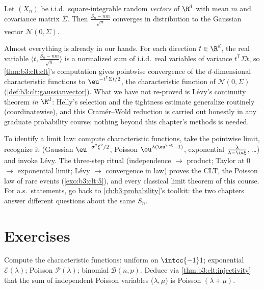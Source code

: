\begin{theorem}
\label{thm:b3:clt:multiclt}
Let $(X_n)$ be i.i.d.\ square-integrable random
\emph{vectors} of $\R^d$ with mean $m$ and covariance matrix
$\Sigma$. Then $\frac{S_n - nm}{\sqrt n}$ converges in
distribution to the Gaussian vector $\mathcal N(0,
\Sigma)$.
\admitted
\end{theorem}

\begin{remark}\label{rem:b3:clt:multiclt}
Almost everything is already in our hands. For each
direction $t \in \R^d$, the real variable $\langle t,
\frac{S_n - nm}{\sqrt n}\rangle$ is a normalized sum of
i.i.d.\ real variables of variance $t^{\mathsf T}\Sigma t$,
so \cref{thm:b3:clt:clt}'s computation gives pointwise
convergence of the $d$-dimensional characteristic functions
to $\eu^{-t^{\mathsf T}\Sigma t/2}$, the characteristic
function of $\mathcal N(0, \Sigma)$
(\cref{def:b3:clt:gaussianvector}). What we have not
re-proved is L\'evy's continuity theorem \emph{in $\R^d$}:
Helly's selection and the tightness estimate generalize
routinely (coordinatewise), and this Cram\'er--Wold
reduction is carried out honestly in any graduate
probability course; nothing beyond this chapter's methods is
needed.
\end{remark}

\begin{method}\label{met:b3:clt:method}
To identify a limit law: compute characteristic functions,
take the pointwise limit, recognize it (Gaussian
$\eu^{-\sigma^2\xi^2/2}$, Poisson
$\eu^{\lambda(\eu^{\iu\xi}-1)}$, exponential $\frac{\lambda}
{\lambda - \iu\xi}$, \dots) and invoke L\'evy. The three-step
ritual (independence $\to$ product; Taylor at $0$ $\to$
exponential limit; L\'evy $\to$ convergence in law) proves
the CLT, the Poisson law of rare events
(\cref{exo:b3:clt:5}), and every classical limit theorem of
this course. For a.s.\ statements, go back to
\cref{ch:b3:probability}'s toolkit: the two chapters answer
different questions about the same $S_n$.
\end{method}

\section{Exercises}

\begin{exercise}[$\star$]\label{exo:b3:clt:1}
Compute the characteristic functions: uniform on
$\intcc{-1}1$; exponential $\mathcal E(\lambda)$; Poisson
$\mathcal P(\lambda)$; binomial $\mathcal B(n, p)$. Deduce
via \cref{thm:b3:clt:injectivity} that the sum of independent
Poisson variables ($\lambda, \mu$) is Poisson $(\lambda +
\mu)$.
\end{exercise}

